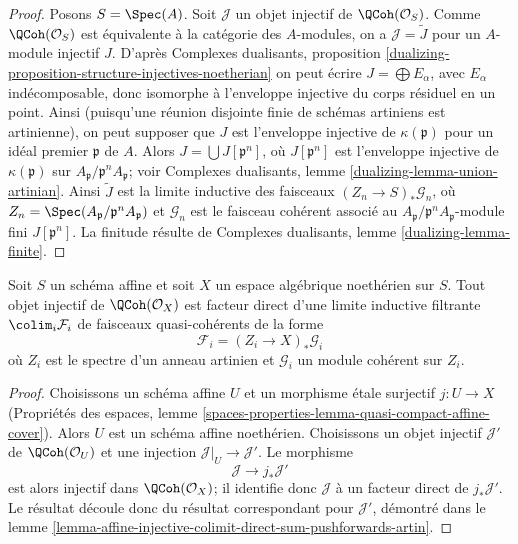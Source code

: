 \begin{proof}
Posons $S = \Spec(A)$. Soit $\mathcal{J}$ un objet injectif de
$\QCoh(\mathcal{O}_S)$. Comme $\QCoh(\mathcal{O}_S)$ est
\'equivalente \`a la cat\'egorie des $A$-modules, on a
$\mathcal{J}=\widetilde{J}$ pour un $A$-module injectif $J$.
D'apr\`es Complexes dualisants, proposition
\ref{dualizing-proposition-structure-injectives-noetherian}
on peut \'ecrire $J = \bigoplus E_\alpha$, avec $E_\alpha$ ind\'ecomposable,
donc isomorphe \`a l'enveloppe injective du corps r\'esiduel en un point.
Ainsi (puisqu'une r\'eunion disjointe finie de sch\'emas artiniens est
artinienne), on peut supposer que $J$ est l'enveloppe injective de
$\kappa(\mathfrak p)$ pour un id\'eal premier $\mathfrak p$ de $A$.
Alors $J = \bigcup J[\mathfrak p^n]$, o\`u $J[\mathfrak p^n]$ est
l'enveloppe injective de $\kappa(\mathfrak p)$ sur
$A_\mathfrak p/\mathfrak p^nA_\mathfrak p$; voir
Complexes dualisants, lemme \ref{dualizing-lemma-union-artinian}.
Ainsi $\widetilde{J}$ est la limite inductive des faisceaux
$(Z_n \to S)_*\mathcal{G}_n$, o\`u
$Z_n = \Spec(A_\mathfrak p/\mathfrak p^nA_\mathfrak p)$ et
$\mathcal{G}_n$ est le faisceau coh\'erent associ\'e au
$A_\mathfrak p/\mathfrak p^nA_\mathfrak p$-module fini
$J[\mathfrak p^n]$. La finitude r\'esulte de
Complexes dualisants, lemme \ref{dualizing-lemma-finite}.
\end{proof}

\begin{lemma}
\label{lemma-injective-colimit-direct-sum-pushforwards-artin}
Soit $S$ un sch\'ema affine et soit $X$ un espace alg\'ebrique noeth\'erien
sur $S$. Tout objet injectif de $\QCoh(\mathcal{O}_X)$ est facteur direct
d'une limite inductive filtrante $\colim_i \mathcal{F}_i$ de faisceaux
quasi-coh\'erents de la forme
$$
\mathcal{F}_i = (Z_i \to X)_*\mathcal{G}_i
$$
o\`u $Z_i$ est le spectre d'un anneau artinien et $\mathcal{G}_i$ un module
coh\'erent sur $Z_i$.
\end{lemma}

\begin{proof}
Choisissons un sch\'ema affine $U$ et un morphisme \'etale surjectif
$j : U \to X$ (Propri\'et\'es des espaces, lemme
\ref{spaces-properties-lemma-quasi-compact-affine-cover}).
Alors $U$ est un sch\'ema affine noeth\'erien. Choisissons un objet injectif
$\mathcal{J}'$ de $\QCoh(\mathcal{O}_U)$ et une injection
$\mathcal{J}|_U \to \mathcal{J}'$. Le morphisme
$$
\mathcal{J} \to j_*\mathcal{J}'
$$
est alors injectif dans $\QCoh(\mathcal{O}_X)$; il identifie donc
$\mathcal{J}$ \`a un facteur direct de $j_*\mathcal{J}'$.
Le r\'esultat d\'ecoule donc du r\'esultat correspondant pour
$\mathcal{J}'$, d\'emontr\'e dans le lemme
\ref{lemma-affine-injective-colimit-direct-sum-pushforwards-artin}.
\end{proof}

